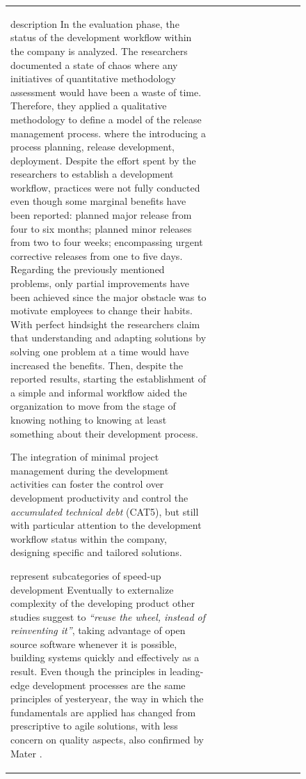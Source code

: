 \documentclass[12pt,journal,compsoc]{../sty/IEEEtran}
\begin{document}
\begin{table}[!t]
\begin{figure}[!t]
\begin{compactitem}
\begin{table}[!t]
\begin{tabular}{|l||c||c||c||c||c||c||c||c||c|}
description In the evaluation phase, the status of the development workflow
within the  company  is analyzed. The researchers documented a state of chaos
where any  initiatives of quantitative methodology assessment would have been a
waste of  time. Therefore, they applied a qualitative methodology to define a
model of the  release management process.  %
where the  %
introducing a process  %
planning, release development,  %
deployment.  Despite the effort spent by the researchers to establish a
development workflow,  practices were not fully conducted even though some
marginal benefits have been  reported: planned major release from four to six
months; planned minor releases  from two to four weeks; encompassing urgent
corrective releases from one to five  days.  Regarding the previously mentioned
problems, only  partial improvements have been achieved since the major obstacle
was to  motivate employees to change their habits. With perfect hindsight the
researchers claim that understanding and adapting solutions by solving one
problem at a time would have increased the benefits. Then, despite the reported
results, starting the establishment of a simple and informal workflow aided the
organization to move from the stage of knowing nothing to knowing at least
something about their development process.

The integration of minimal project management during the development activities
can foster the control over development productivity and control the
\textit{accumulated technical debt} (CAT5), but still with particular attention
to the development workflow status within the company, designing specific and
tailored solutions.

represent subcategories of speed-up development  Eventually to externalize
complexity of the developing product %
other studies \cite{Wall2001, Bean2005} suggest to \textit{``reuse the  wheel,
instead of reinventing it''}, taking advantage of open source software  whenever
it is possible, building systems quickly and effectively as a result.  Even
though the principles in leading-edge development processes are the same
principles of yesteryear, the way in which the fundamentals are applied has
changed from prescriptive to agile solutions, with less concern on quality
aspects, also confirmed by Mater \cite{Mater2000}.


\end{tabular}
\end{table}
\end{compactitem}
\end{figure}
\end{table}
\end{document}
